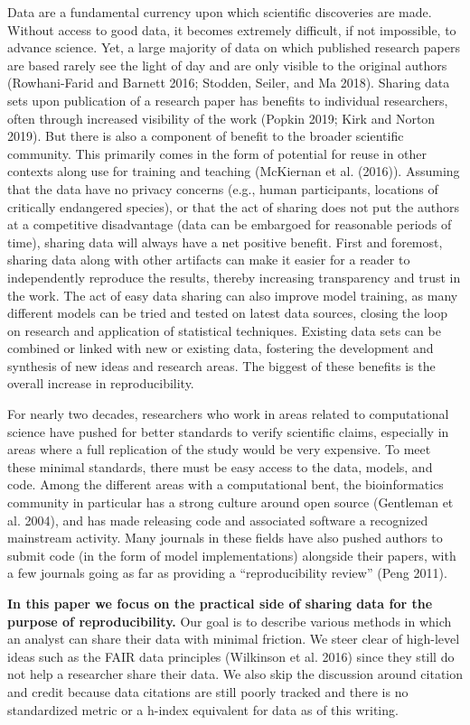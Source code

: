 \documentclass[
]{article}
\begin{document}
Data are a fundamental currency upon which scientific discoveries are made. Without access to good data, it becomes extremely difficult, if not impossible, to advance science. Yet, a large majority of data on which published research papers are based rarely see the light of day and are only visible to the original authors (Rowhani-Farid and Barnett 2016; Stodden, Seiler, and Ma 2018). Sharing data sets upon publication of a research paper has benefits to individual researchers, often through increased visibility of the work (Popkin 2019; Kirk and Norton 2019). But there is also a component of benefit to the broader scientific community. This primarily comes in the form of potential for reuse in other contexts along use for training and teaching (McKiernan et al. (2016)). Assuming that the data have no privacy concerns (e.g., human participants, locations of critically endangered species), or that the act of sharing does not put the authors at a competitive disadvantage (data can be embargoed for reasonable periods of time), sharing data will always have a net positive benefit. First and foremost, sharing data along with other artifacts can make it easier for a reader to independently reproduce the results, thereby increasing transparency and trust in the work. The act of easy data sharing can also improve model training, as many different models can be tried and tested on latest data sources, closing the loop on research and application of statistical techniques. Existing data sets can be combined or linked with new or existing data, fostering the development and synthesis of new ideas and research areas. The biggest of these benefits is the overall increase in reproducibility.

For nearly two decades, researchers who work in areas related to computational science have pushed for better standards to verify scientific claims, especially in areas where a full replication of the study would be very expensive. To meet these minimal standards, there must be easy access to the data, models, and code. Among the different areas with a computational bent, the bioinformatics community in particular has a strong culture around open source (Gentleman et al. 2004), and has made releasing code and associated software a recognized mainstream activity. Many journals in these fields have also pushed authors to submit code (in the form of model implementations) alongside their papers, with a few journals going as far as providing a ``reproducibility review'' (Peng 2011).

\textbf{In this paper we focus on the practical side of sharing data for the purpose of reproducibility.} Our goal is to describe various methods in which an analyst can share their data with minimal friction. We steer clear of high-level ideas such as the FAIR data principles (Wilkinson et al. 2016) since they still do not help a researcher share their data. We also skip the discussion around citation and credit because data citations are still poorly tracked and there is no standardized metric or a h-index equivalent for data as of this writing.
\end{document}
